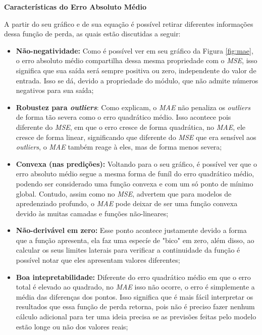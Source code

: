\textbf{Características do Erro Absoluto Médio}
\vspace{1em}

A partir do seu gráfico e de sua equação é possível retirar diferentes informações dessa função de perda, as quais estão discutidas a seguir:

\begin{itemize}
    \item \textbf{Não-negatividade:} Como é possível ver em seu gráfico da Figura \ref{fig:mae}, o erro absoluto médio compartilha dessa mesma propriedade com o \textit{MSE}, isso significa que sua saída será sempre positiva ou zero, independente do valor de entrada. Isso se dá, devido a propriedade do módulo, que não admite números negativos para sua saída;
    \item \textbf{Robustez para \textit{outliers}}: Como \textcite{LossesArticle} explicam, o \textit{MAE} não penaliza os \textit{outliers} de forma tão severa como o erro quadrático médio. Isso acontece pois diferente do \textit{MSE}, em que o erro cresce de forma quadrática, no \textit{MAE}, ele cresce de forma linear, significando que diferente do \textit{MSE} que era sensível aos \textit{outliers}, o \textit{MAE} também reage à eles, mas de forma menos severa;
    \item \textbf{Convexa (nas predições):} Voltando para o seu gráfico, é possível ver que o erro absoluto médio segue a mesma forma de funíl do erro quadrático médio, podendo ser considerado uma função convexa e com um só ponto de mínimo global. Contudo, assim como no \textit{MSE}, \textcite{LossesArticle} advertem que para modelos de apredenziado profundo, o \textit{MAE} pode deixar de ser uma função convexa devido às muitas camadas e funções não-lineares;
    \item \textbf{Não-derivável em zero:} Esse ponto acontece justamente devido a forma que a função apresenta, ela faz uma especíe de "bico" em zero, além disso, ao calcular os seus limites laterais para verificar a continuidade da função é possível notar que eles apresentam valores diferentes;
    \item \textbf{Boa intepretabilidade:} Diferente do erro quadrático médio em que o erro total é elevado ao quadrado, no \textit{MAE} isso não ocorre, o erro é simplemente a média das diferenças dos pontos. Isso significa que é mais fácil interpretar os resultados que essa função de perda retorna, pois não é preciso fazer nenhum cálculo adicional para ter uma ideia precisa se as previsões feitas pelo modelo estão longe ou não dos valores reais;
\end{itemize}

